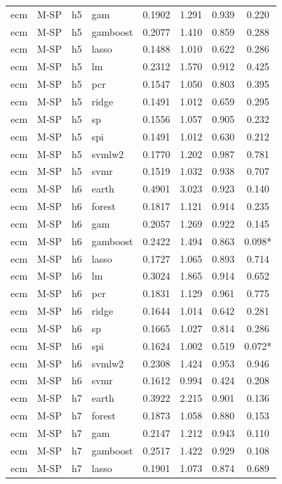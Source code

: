 \begin{ThreePartTable}
\begin{longtable}[t]{llclcccc}
ecm & M-SP & h5 & gam & 0.1902 & 1.291 & 0.939 & 0.220\\
ecm & M-SP & h5 & gamboost & 0.2077 & 1.410 & 0.859 & 0.288\\
ecm & M-SP & h5 & lasso & 0.1488 & 1.010 & 0.622 & 0.286\\
ecm & M-SP & h5 & lm & 0.2312 & 1.570 & 0.912 & 0.425\\
ecm & M-SP & h5 & pcr & 0.1547 & 1.050 & 0.803 & 0.395\\
ecm & M-SP & h5 & ridge & 0.1491 & 1.012 & 0.659 & 0.295\\
ecm & M-SP & h5 & sp & 0.1556 & 1.057 & 0.905 & 0.232\\
ecm & M-SP & h5 & spi & 0.1491 & 1.012 & 0.630 & 0.212\\
ecm & M-SP & h5 & svmlw2 & 0.1770 & 1.202 & 0.987 & 0.781\\
ecm & M-SP & h5 & svmr & 0.1519 & 1.032 & 0.938 & 0.707\\
\addlinespace
ecm & M-SP & h6 & earth & 0.4901 & 3.023 & 0.923 & 0.140\\
ecm & M-SP & h6 & forest & 0.1817 & 1.121 & 0.914 & 0.235\\
ecm & M-SP & h6 & gam & 0.2057 & 1.269 & 0.922 & 0.145\\
ecm & M-SP & h6 & gamboost & 0.2422 & 1.494 & 0.863 & 0.098*\\
ecm & M-SP & h6 & lasso & 0.1727 & 1.065 & 0.893 & 0.714\\
ecm & M-SP & h6 & lm & 0.3024 & 1.865 & 0.914 & 0.652\\
ecm & M-SP & h6 & pcr & 0.1831 & 1.129 & 0.961 & 0.775\\
ecm & M-SP & h6 & ridge & 0.1644 & 1.014 & 0.642 & 0.281\\
ecm & M-SP & h6 & sp & 0.1665 & 1.027 & 0.814 & 0.286\\
ecm & M-SP & h6 & spi & 0.1624 & 1.002 & 0.519 & 0.072*\\
ecm & M-SP & h6 & svmlw2 & 0.2308 & 1.424 & 0.953 & 0.946\\
ecm & M-SP & h6 & svmr & 0.1612 & 0.994 & 0.424 & 0.208\\
\addlinespace
ecm & M-SP & h7 & earth & 0.3922 & 2.215 & 0.901 & 0.136\\
ecm & M-SP & h7 & forest & 0.1873 & 1.058 & 0.880 & 0.153\\
ecm & M-SP & h7 & gam & 0.2147 & 1.212 & 0.943 & 0.110\\
ecm & M-SP & h7 & gamboost & 0.2517 & 1.422 & 0.929 & 0.108\\
ecm & M-SP & h7 & lasso & 0.1901 & 1.073 & 0.874 & 0.689\\

\end{longtable}
\end{ThreePartTable}
